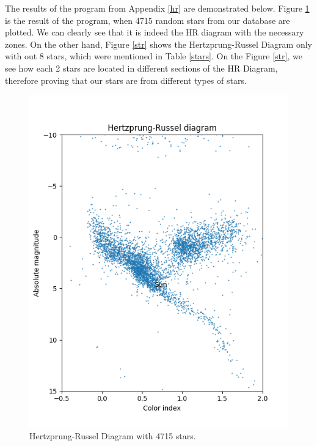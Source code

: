 \documentclass[a4paper,10pt]{article}
\begin{document}
  The results of the program from Appendix \ref{hr} are demonstrated below. Figure \ref{full} is the result of the program, when 4715 random stars from our database are plotted. We can clearly see that it is indeed the HR diagram with the necessary zones. On the other hand, Figure \ref{str} shows the Hertzprung-Russel Diagram only with out 8 stars, which were mentioned in Table \ref{stars}. On the Figure \ref{str}, we see how each 2 stars are located in different sections of the HR Diagram, therefore proving that our stars are from different types of stars. 
  \begin{figure}[h]
    \centering
    \begin{minipage}[b]{0.45\textwidth}
      \includegraphics[width=\textwidth]{full.png}
      \caption{Hertzprung-Russel Diagram with 4715 stars.}
      \label{full}
    \end{minipage}
    \hfill
    \begin{minipage}[b]{0.45\textwidth}

\end{minipage}
\end{figure}
\end{document}
